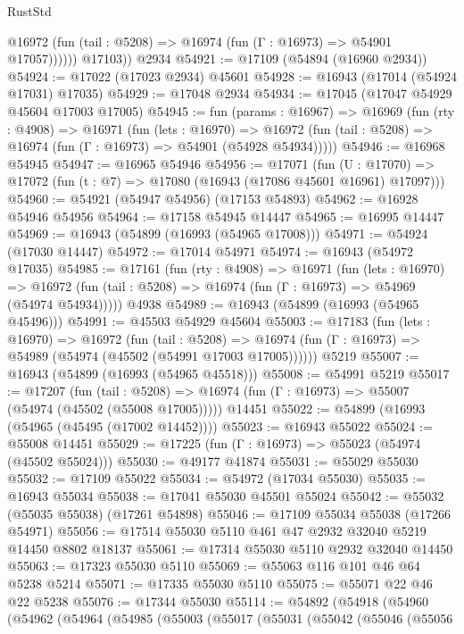 \begin{lexlean}{RustStd}
\begin{coremodule}
              @16972 (fun (tail : @5208) => @16974 (fun (Γ : @16973) => @54901 @17057))))))
        @17103))
    @2934
@54921 := @17109 (@54894 (@16960 @2934))
@54924 := @17022 (@17023 @2934) @45601
@54928 := @16943 (@17014 (@54924 @17031) @17035)
@54929 := @17048 @2934
@54934 := @17045 (@17047 @54929 @45604 @17003 @17005)
@54945 := fun (params : @16967) =>
  @16969
    (fun (rty : @4908) =>
    @16971
      (fun (lets : @16970) =>
      @16972 (fun (tail : @5208) => @16974 (fun (Γ : @16973) => @54901 (@54928 @54934)))))
@54946 := @16968 @54945
@54947 := @16965 @54946
@54956 := @17071
    (fun (U : @17070) => @17072 (fun (t : @7) => @17080 (@16943 (@17086 @45601 @16961) @17097)))
@54960 := @54921 (@54947 @54956) (@17153 @54893)
@54962 := @16928 @54946 @54956
@54964 := @17158 @54945 @14447
@54965 := @16995 @14447
@54969 := @16943 (@54899 (@16993 (@54965 @17008)))
@54971 := @54924 (@17030 @14447)
@54972 := @17014 @54971
@54974 := @16943 (@54972 @17035)
@54985 := @17161
    (fun (rty : @4908) =>
    @16971
      (fun (lets : @16970) =>
      @16972 (fun (tail : @5208) => @16974 (fun (Γ : @16973) => @54969 (@54974 @54934)))))
    @4938
@54989 := @16943 (@54899 (@16993 (@54965 @45496)))
@54991 := @45503 @54929 @45604
@55003 := @17183
    (fun (lets : @16970) =>
    @16972
      (fun (tail : @5208) =>
      @16974 (fun (Γ : @16973) => @54989 (@54974 (@45502 (@54991 @17003 @17005))))))
    @5219
@55007 := @16943 (@54899 (@16993 (@54965 @45518)))
@55008 := @54991 @5219
@55017 := @17207
    (fun (tail : @5208) => @16974 (fun (Γ : @16973) => @55007 (@54974 (@45502 (@55008 @17005)))))
    @14451
@55022 := @54899 (@16993 (@54965 (@45495 (@17002 @14452))))
@55023 := @16943 @55022
@55024 := @55008 @14451
@55029 := @17225 (fun (Γ : @16973) => @55023 (@54974 (@45502 @55024)))
@55030 := @49177 @41874
@55031 := @55029 @55030
@55032 := @17109 @55022
@55034 := @54972 (@17034 @55030)
@55035 := @16943 @55034
@55038 := @17041 @55030 @45501 @55024
@55042 := @55032 (@55035 @55038) (@17261 @54898)
@55046 := @17109 @55034 @55038 (@17266 @54971)
@55056 := @17514 @55030 @5110 @461 @47 @2932 @32040 @5219 @14450 @8802 @18137
@55061 := @17314 @55030 @5110 @2932 @32040 @14450
@55063 := @17323 @55030 @5110
@55069 := @55063 @116 @101 @46 @64 @5238 @5214
@55071 := @17335 @55030 @5110
@55075 := @55071 @22 @46 @22 @5238
@55076 := @17344 @55030
@55114 := @54892
    (@54918
      (@54960
        (@54962
          (@54964
            (@54985
              (@55003
                (@55017
                  (@55031
                    (@55042
                      (@55046
                        (@55056

\end{coremodule}
\end{lexlean}
